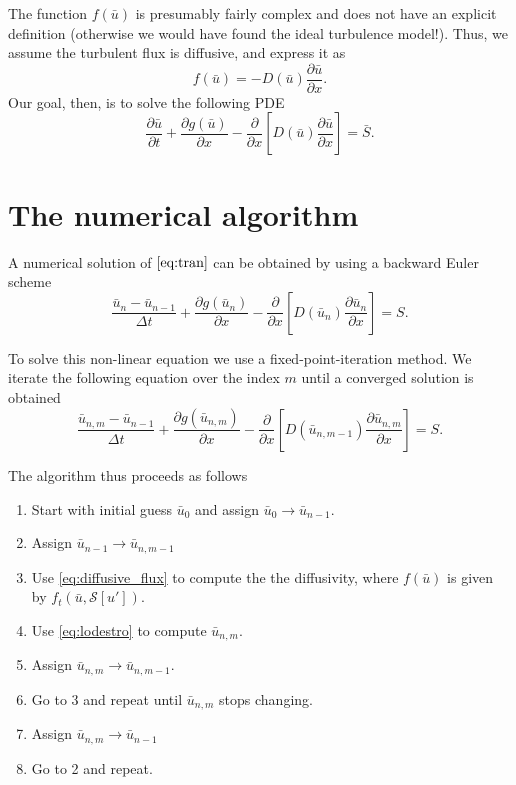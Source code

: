 \documentclass{article}
\begin{document}
The function $f(\bar{u})$ is presumably fairly complex and does not have an explicit definition (otherwise we would have found the ideal turbulence model!). Thus, we assume the turbulent flux is diffusive, and express it as
\begin{equation}
\label{eq:diffusive_flux}
    f(\bar{u}) = -D(\bar{u}) \frac{\partial \bar{u}}{\partial x}.
\end{equation}
Our goal, then, is to solve the following PDE
\begin{equation}
\label{eq:tran}
    \frac{\partial \bar{u}}{\partial t} + \frac{\partial g(\bar{u})}{\partial x} - \frac{\partial}{\partial x} \left [D(\bar{u}) \frac{\partial \bar{u}}{\partial x} \right] = \bar{S}.
\end{equation}

\section{The numerical algorithm}
A numerical solution of $\cref{eq:tran}$ can be obtained by using a backward Euler scheme
\begin{equation}
    \frac{\bar{u}_n - \bar{u}_{n-1}}{\Delta t} + \frac{\partial g(\bar{u}_n)}{\partial x} - \frac{\partial}{\partial x} \left [ D(\bar{u}_n) \frac{\partial \bar{u}_n}{\partial x} \right ] = S.
\end{equation}

To solve this non-linear equation we use a fixed-point-iteration method. We iterate the following equation over the index $m$ until a converged solution is obtained
\begin{equation}
\label{eq:lodestro}
    \frac{\bar{u}_{n,m} - \bar{u}_{n-1}}{\Delta t} + \frac{\partial g(\bar{u}_{n,m})}{\partial x} - \frac{\partial}{\partial x} \left [ D(\bar{u}_{n,m-1}) \frac{\partial \bar{u}_{n,m}}{\partial x} \right ]= S.
\end{equation}

The algorithm thus proceeds as follows
\begin{enumerate}
\item Start with initial guess $\bar{u}_{0}$ and assign $\bar{u}_{0} \to \bar{u}_{n-1}$.
\item Assign $\bar{u}_{n-1} \to \bar{u}_{n,m-1}$
\item Use \cref{eq:diffusive_flux} to compute the the diffusivity, where $f(\bar{u})$ is given by $f_t(\bar{u},\mathcal{S}[u'])$.
\item Use \cref{eq:lodestro} to compute $\bar{u}_{n,m}$.
\item Assign $\bar{u}_{n,m} \to \bar{u}_{n,m-1}$.
\item Go to 3 and repeat until $\bar{u}_{n,m}$ stops changing.
\item Assign $\bar{u}_{n,m} \to \bar{u}_{n-1}$
\item Go to 2 and repeat.
\end{enumerate}
\end{document}
